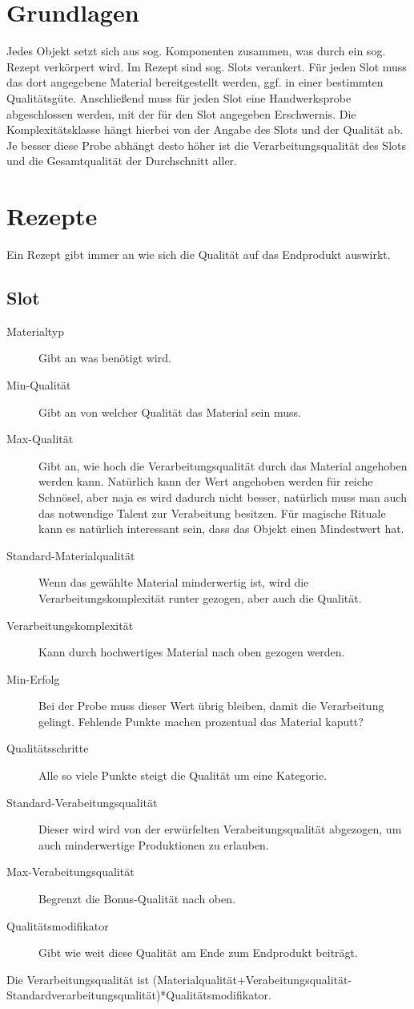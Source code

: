 \documentclass[a4paper,12pt,oneside]{book}
\begin{document}
\chapter{Grundlagen}
Jedes Objekt setzt sich aus sog. Komponenten zusammen, was durch ein sog. Rezept verkörpert wird. Im Rezept sind sog. Slots verankert. Für jeden Slot muss das dort angegebene Material bereitgestellt werden, ggf. in einer bestimmten Qualitätsgüte. Anschließend muss für jeden Slot eine Handwerksprobe abgeschlossen werden, mit der für den Slot angegeben Erschwernis. Die Komplexitätsklasse hängt hierbei von der Angabe des Slots und der Qualität ab. Je besser diese Probe abhängt desto höher ist die Verarbeitungsqualität des Slots und die Gesamtqualität der Durchschnitt aller.
\chapter{Rezepte}
Ein Rezept gibt immer an wie sich die Qualität auf das Endprodukt auswirkt.
\section{Slot}
\begin{description}
\item[Materialtyp]Gibt an was benötigt wird.
\item[Min-Qualität]Gibt an von welcher Qualität das Material sein muss.
\item[Max-Qualität]Gibt an, wie hoch die Verarbeitungsqualität durch das Material angehoben werden kann. Natürlich kann der Wert angehoben werden für reiche Schnösel, aber naja es wird dadurch nicht besser, natürlich muss man auch das notwendige Talent zur Verabeitung besitzen. Für magische Rituale kann es natürlich interessant sein, dass das Objekt einen Mindestwert hat.
\item[Standard-Materialqualität]Wenn das gewählte Material minderwertig ist, wird die Verarbeitungskomplexität runter gezogen, aber auch die Qualität.
\item[Verarbeitungskomplexität]Kann durch hochwertiges Material nach oben gezogen werden.
\item[Min-Erfolg]Bei der Probe muss dieser Wert übrig bleiben, damit die Verarbeitung gelingt. Fehlende Punkte machen prozentual das Material kaputt?
\item[Qualitätsschritte]Alle so viele Punkte steigt die Qualität um eine Kategorie.
\item[Standard-Verabeitungsqualität]Dieser wird wird von der erwürfelten Verabeitungsqualität abgezogen, um auch minderwertige Produktionen zu erlauben.
\item[Max-Verabeitungsqualität]Begrenzt die Bonus-Qualität nach oben.
\item[Qualitätsmodifikator]Gibt wie weit diese Qualität am Ende zum Endprodukt beiträgt.
\end{description}
Die Verarbeitungsqualität ist (Materialqualität+Verabeitungsqualität-Standardverarbeitungsqualität)*Qualitätsmodifikator.
\end{document}
